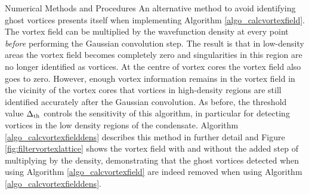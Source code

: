 \begin{chapter}{\label{cha:numerics}Numerical Methods and Procedures}
An alternative method to avoid identifying ghost vortices presents itself when implementing Algorithm \ref{algo_calcvortexfield}. The vortex field can be multiplied by the wavefunction density at every point {\it before} performing the Gaussian convolution step. The result is that in low-density areas the vortex field becomes completely zero and singularities in this region are no longer identified as vortices. At the centre of vortex cores the vortex field also goes to zero. However, enough vortex information remains in the vortex field in the vicinity of the vortex cores that vortices in high-density regions are still identified accurately after the Gaussian convolution. As before, the threshold value $\Delta_{\rm th}$ controls the sensitivity of this algorithm, in particular for detecting vortices in the low density regions of the condensate. Algorithm \ref{algo_calcvortexfielddens} describes this method in further detail and Figure \ref{fig:filtervortexlattice} shows the vortex field with and without the added step of multiplying by the density, demonstrating that the ghost vortices detected when using Algorithm \ref{algo_calcvortexfield} are indeed removed when using Algorithm \ref{algo_calcvortexfielddens}.
\begin{figure}[!ht]
\begin{center}
\begin{minipage}{0.8\linewidth}%
\end{minipage}
\end{center}
\end{figure}
\end{chapter}
